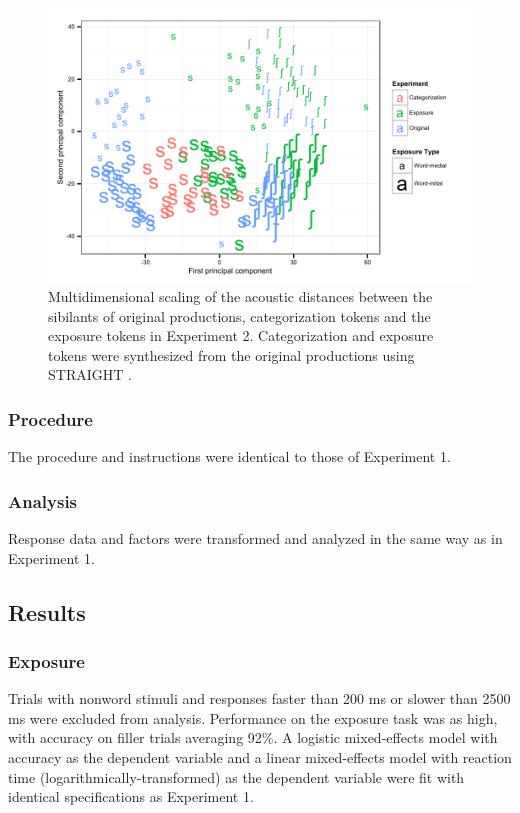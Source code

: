 \begin{figure}[ht]
\caption{Multidimensional scaling of the acoustic distances between the sibilants of original productions, categorization tokens and the exposure tokens in Experiment 2.  Categorization and exposure tokens were synthesized from the original productions using STRAIGHT \citep{Kawahara2008}.}
\label{fig:exp2mds}
\begin{center}
\includegraphics[width=\textwidth]{graphs/exp2_mds}
\end{center}
\end{figure}

\subsubsection{Procedure}

The procedure and instructions were identical to those of Experiment 1.

\subsubsection{Analysis}

Response data and factors were transformed and analyzed in the same way as in Experiment 1.

\subsection{Results}

\subsubsection{Exposure}

Trials with nonword stimuli and responses faster than 200 ms or slower than 2500 ms were excluded from analysis. 
Performance on the exposure task was as high, with accuracy on filler trials averaging 92\%.  
A logistic mixed-effects model with accuracy as the dependent variable and a linear mixed-effects model with reaction time (logarithmically-transformed) as the dependent variable were fit with identical specifications as Experiment 1.

